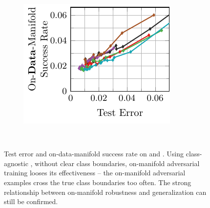 \begin{appendix}
\begin{figure}[t]
\begin{subfigure}{0.235\textwidth}
        \includegraphics[width=\textwidth]{appendix_data_emnist_error_on_learned.pdf}
    \end{subfigure}
    \\
    \caption{Test error and on-data-manifold success rate on \Fonts and \MNIST. Using class-agnostic \VAEGANs, without clear class boundaries, on-manifold adversarial training looses its effectiveness -- the on-manifold adversarial examples cross the true class boundaries too often. The strong relationship between on-manifold robustness and generalization can still be confirmed.}
    \label{fig:appendix-data}
\end{figure}


\end{appendix}
